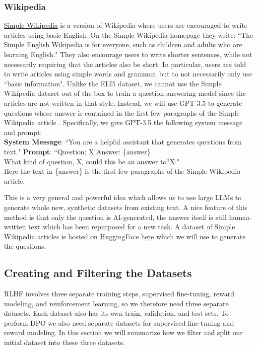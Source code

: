 \documentclass[11pt, oneside]{article}   	%
\begin{document}
\subsubsection*{Wikipedia}
\href{https://simple.Wikipedia.org/Wiki/Main_Page}{Simple Wikipedia} is a version of Wikipedia where users are encouraged to write articles using basic English.
On the Simple Wikipedia homepage they write: ``The Simple English Wikipedia is for everyone, such as children and adults who are learning English."
They also encourage users to write shorter sentences, while not necessarily requiring that the articles also be short.
In particular, users are told to write articles using simple words and grammar, but to not necessarily only use ``basic information".
Unlike the ELI5 dataset, we cannot use the Simple Wikipedia dataset out of the box to train a question-answering model since the articles are not written in that style.
Instead, we will use GPT-3.5 to generate questions whose answer is contained in the first few paragraphs of the Simple Wikipedia article \cite{koksal2023longform}. 
Specifically, we give GPT-3.5 the following system message and prompt:
\\[5pt]
\indent \textbf{System Message}: ``You are a helpful assistant that generates questions from text."
\indent \textbf{Prompt}: ``Question: X
\newline
\indent\indent\indent\indent Answer: \{answer\} 
\\
\indent\indent\indent\indent What kind of question, X, could this be an answer to?\newline \indent\indent\indent\indent X:"
\\[5pt]
Here the text in \{answer\} is the first few paragraphs of the Simple Wikipedia article.

This is a very general and powerful idea which allows us to use large LLMs to generate whole new, synthetic datasets from existing text.
A nice feature of this method is that only the question is AI-generated, the answer itself is still human-written text which has been repurposed for a new task.
A dataset of Simple Wikipedia articles is hosted on HuggingFace \href{https://huggingface.co/datasets/Wikipedia/viewer/20220301.simple/train}{here} which we will use to generate the questions.

\subsection{Creating and Filtering the Datasets}
RLHF involves three separate training steps, supervised fine-tuning, reward modeling, and reinforcement learning, so we therefore need three separate datasets.
Each dataset also has its own train, validation, and test sets.
To perform DPO we also need separate datasets for supervised fine-tuning and reward modeling.
In this section we will summarize how we filter and split our initial dataset into these three datasets.
\end{document}
